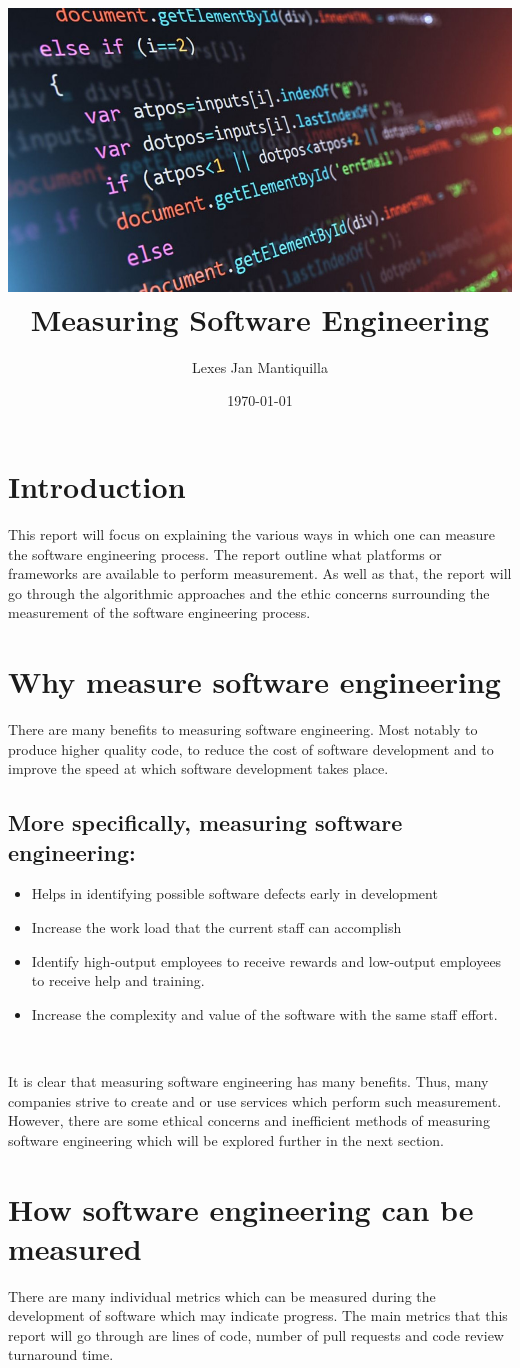 \documentclass{article}
\title{\includegraphics[width=\textwidth]{images/cover.jpg}\\Measuring Software Engineering}
\author{Lexes Jan Mantiquilla}
\date{\today}
\begin{document}
\maketitle
\newpage

\tableofcontents
\newpage

\section{Introduction}
This report will focus on explaining the various ways in which one can measure
the software engineering process. The report outline what platforms or
frameworks are available to perform measurement. As well as that, the report
will go through the algorithmic approaches and the ethic concerns surrounding
the measurement of the software engineering process.

\section{Why measure software engineering}
There are many benefits to measuring software engineering. Most notably to
produce higher quality code, to reduce the cost of software development and to
improve the speed at which software development takes place.
\subsection{More specifically, measuring software engineering:}
\begin{itemize}
  \item Helps in identifying possible software defects early in development
  \item Increase the work load that the current staff can accomplish
  \item Identify high-output employees to receive rewards and low-output
    employees to receive help and training.
  \item Increase the complexity and value of the software with the same staff
    effort.
\end{itemize}
~\cite{scacchi1995understanding}

It is clear that measuring software engineering has many benefits. Thus, many
companies strive to create and or use services which perform such measurement.
However, there are some ethical concerns and inefficient methods of measuring
software engineering which will be explored further in the next section.

\section{How software engineering can be measured}
There are many individual metrics which can be measured during the development
of software which may indicate progress. The main metrics that this report will
go through are lines of code, number of pull requests and code review
turnaround time.
\end{document}
